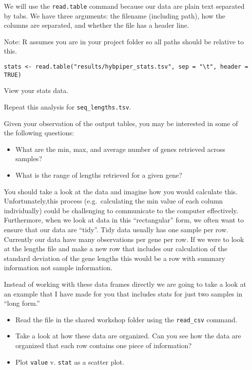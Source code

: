\documentclass[
]{book}
\providecommand{\tightlist}{%
  \setlength{\itemsep}{0pt}\setlength{\parskip}{0pt}}
\begin{document}
We will use the \texttt{read.table} command because our data are plain text separated by tabs.
We have three arguments: the filename (including path), how the columns are separated, and whether the file has a header line.

Note: R assumes you are in your project folder so all paths should be relative to this.

\begin{verbatim}
stats <- read.table("results/hybpiper_stats.tsv", sep = "\t", header = TRUE)
\end{verbatim}

View your stats data.

Repeat this analysis for \texttt{seq\_lengths.tsv}.

Given your observation of the output tables, you may be interested in some of the following questions:

\begin{itemize}
\tightlist
\item
  What are the min, max, and average number of genes retrieved across samples?
\item
  What is the range of lengths retrieved for a given gene?
\end{itemize}

You should take a look at the data and imagine how you would calculate this.
Unfortunately,this process (e.g.~calculating the min value of each column individually) could be challenging to communicate to the computer effectively.
Furthermore, when we look at data in this ``rectangular'' form, we often want to ensure that our
data are ``tidy''.
Tidy data usually has one sample per row.
Currently our data have many observations per gene per row.
If we were to look at the lengths file and make a new row that includes our
calculation of the standard deviation of the gene lengths this would be a row with summary
information not sample information.

Instead of working with these data frames directly we are going to take a look at an example
that I have made for you that includes stats for just two samples in ``long form.''

\begin{itemize}
\tightlist
\item
  Read the file in the shared workshop folder using the \texttt{read\_csv} command.
\item
  Take a look at how these data are organized. Can you see how the data are organized that each row contains one piece of information?
\item
  Plot \texttt{value} v. \texttt{stat} as a scatter plot.
\end{itemize}
\end{document}
